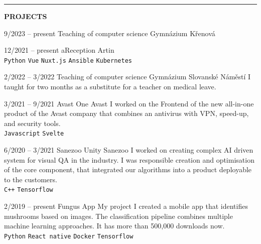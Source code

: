 \documentclass[10pt,A4]{article}
\newcommand{\cvsection}[2] {
\textcolor{sectcol}{\uppercase{\textbf{#1}}}
}
\newcommand{\cvsect}[4]{
	\textcolor{#3}{\hrule}
	\colorbox{#3}{ {\cvsection{#1}{#4}}}
}
\begin{document}
	\cvsect{Projects}{0.49}{thirdcol}{textcol}\\[20pt]
	\begin{entrylist}
		\entry
			{9/2023 -- present}
			{Teaching of computer science}
			{Gymnázium Křenová}
			{ 
				\\
			}

		\entry
			{12/2021 -- present}
			{aReception}
			{Artin}
			{ 
				\\ 
				\texttt{Python}\slashsep
				\texttt{Vue}\slashsep
				\texttt{Nuxt.js}\slashsep
				\texttt{Ansible}\slashsep
				\texttt{Kubernetes}
			}

		\entry
			{2/2022 -- 3/2022}
			{Teaching of computer science}
			{Gymnázium Slovanské Náměstí}
			{ I taught for two months as a substitute for a teacher on medical leave. 
				\\
			}

		\entry
			{3/2021 -- 9/2021}
			{Avast One}
			{Avast}
			{ I worked on the Frontend of the new all-in-one product of the Avast company that combines an antivirus with VPN, speed-up, and security tools.
				\\ 
				\texttt{Javascript}\slashsep
				\texttt{Svelte}
			}

		\entry
				{6/2020 -- 3/2021}
				{Sanezoo Unity}
				{Sanezoo}
				{I worked on creating complex AI driven system for visual QA in the industry. 
					I was responsible creation and optimisation of the core component, that integrated our algorithms into a product deployable to the customers. 
					\\ 
					\texttt{C++}\slashsep
					\texttt{Tensorflow}
				}

		\entry
			{2/2019 -- present}
			{Fungus App}
			{My project}
			{I created a mobile app that identifies mushrooms based on
				images. The classification pipeline combines multiple machine learning approaches. 
				It has more than 500,000 downloads now.
				\\ 
				\texttt{Python}\slashsep
				\texttt{React native}\slashsep
				\texttt{Docker}\slashsep
				\texttt{Tensorflow}}
		


\end{entrylist}
\end{document}
